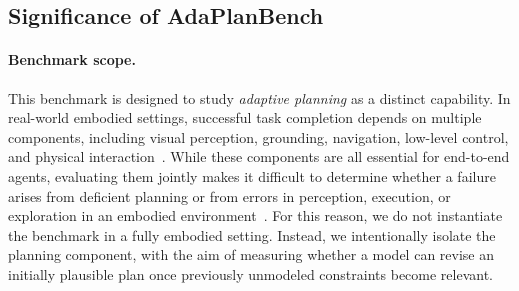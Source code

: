 \documentclass{llmxive}
\providecommand{\bench}[1]{AdaPlanBench}
\begin{document}


\subsection{Significance of \bench{}}
\label{app:discussion-significance-generalization}

\paragraph{Benchmark scope.}
This benchmark is designed to study \emph{adaptive planning} as a distinct capability. In real-world embodied settings, successful task completion depends on multiple components, including visual perception, grounding, navigation, low-level control, and physical interaction~\citep{shridhar2020alfredbenchmarkinterpretinggrounded, ahn2022icanisay,srivastava2022behavior,liu-etal-2025-revisiting}.
While these components are all essential for end-to-end agents, evaluating them jointly makes it difficult to determine whether a failure arises from deficient planning or from errors in perception, execution, or exploration in an embodied environment~\citep{chang2024partnrbenchmarkplanningreasoning,bhatt2025knowyoureuncertainplanning}. 
For this reason, we do not instantiate the benchmark in a fully embodied setting. Instead, we intentionally isolate the planning component, with the aim of measuring whether a model can revise an initially plausible plan once previously unmodeled constraints become relevant.
\end{document}
